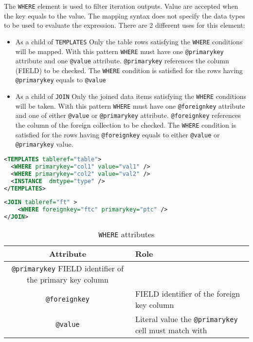 The \texttt{WHERE} element is used to filter iteration outputs. Value are accepted when the key equals to the value. The mapping syntax does not specify the data types to be used to evaluate the expression. 
There  are 2 different uses for this element:
\begin{itemize}
    \item As a child of \texttt{TEMPLATES}  Only the table rows satisfying the \texttt{WHERE} conditions will be mapped. 
             With this pattern \texttt{WHERE} must have one \texttt{@primarykey} attribute and one \texttt{@value} attribute. 
              \texttt{@primarykey} references the column (FIELD) to be checked. 
             The \texttt{WHERE} condition is satisfied for the rows having \texttt{@primarykey} equals to \texttt{@value}     \item As a child of \texttt{JOIN}  Only the joined data items satisfying the \texttt{WHERE} conditions will be taken. 
             With this pattern \texttt{WHERE} must have one \texttt{@foreignkey} attribute and one of either \texttt{@value} or \texttt{@primarykey} attribute. 
              \texttt{@foreignkey} references the column of the foreign collection to be checked. 
             The \texttt{WHERE} condition is satisfied for the rows having \texttt{@foreignkey} equals to either \texttt{@value} or \texttt{@primarykey} value.
\end{itemize}
\begin{lstlisting}[caption={\texttt{WHERE} Example: only rows having val1 as col1 value and  val2 as col2 value are mapped},language=XML]
<TEMPLATES tableref="table">
  <WHERE primarykey="col1" value="val1" />
  <WHERE primarykey="col2" value="val2" />
  <INSTANCE  dmtype="type" />
</TEMPLATES>
\end{lstlisting}

\begin{lstlisting}[caption={\texttt{WHERE} Example: the join is satisfied when the value of the ptc column  is equals to the ftc column of the foreign table },language=XML]
<JOIN tableref="ft" >
	<WHERE foreignkey="ftc" primarykey="ptc" />
</JOIN>
\end{lstlisting}

\begin{table}[!htbp]
\small
\centering
\begin{tabulary}{\linewidth}{|c|J|}       
       \hline 
            \textbf{Attribute} & 
            \textbf {Role}\\
       \hline         \hline  
            \texttt{@primarykey}  
            FIELD identifier of the primary key column \\
        \hline 
            \texttt{@foreignkey} & 
            FIELD identifier of the foreign key column \\
        \hline 
            \texttt{@value} & 
            Literal value the  \texttt{@primarykey} cell must match with\\
        \hline 
     \end{tabulary}
     \caption{\texttt{WHERE} attributes} 
     \label{tbl:where-att}
 \end{table}

